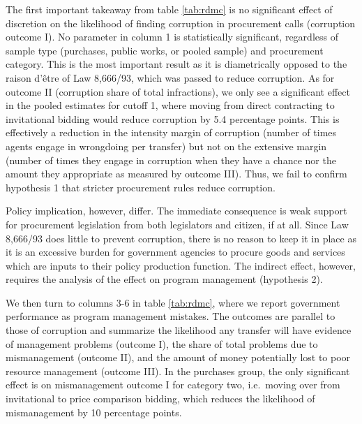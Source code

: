 \documentclass[11pt]{article}
\begin{document}
The first important takeaway from table \ref{tab:rdmc} is no significant effect of discretion on the likelihood of finding corruption in procurement calls (corruption outcome I). No parameter in column 1 is statistically significant, regardless of sample type (purchases, public works, or pooled sample) and procurement category. This is the most important result as it is diametrically opposed to the raison d'être of Law 8,666/93, which was passed to reduce corruption. As for outcome II (corruption share of total infractions), we only see a significant effect in the pooled estimates for cutoff 1, where moving from direct contracting to invitational bidding would reduce corruption by 5.4 percentage points. This is effectively a reduction in the intensity margin of corruption (number of times agents engage in wrongdoing per transfer) but not on the extensive margin (number of times they engage in corruption when they have a chance nor the amount they appropriate as measured by outcome III). Thus, we fail to confirm hypothesis 1 that stricter procurement rules reduce corruption.

Policy implication, however, differ. The immediate consequence is weak support for procurement legislation from both legislators and citizen, if at all. Since Law 8,666/93 does little to prevent corruption, there is no reason to keep it in place as it is an excessive burden for government agencies to procure goods and services which are inputs to their policy production function. The indirect effect, however, requires the analysis of the effect on program management (hypothesis 2).
\clearpage


We then turn to columns 3-6 in table \ref{tab:rdmc}, where we report government performance as program management mistakes. The outcomes are parallel to those of corruption and summarize the likelihood any transfer will have evidence of management problems (outcome I), the share of total problems due to mismanagement (outcome II), and the amount of money potentially lost to poor resource management (outcome III). In the purchases group, the only significant effect is on mismanagement outcome I for category two, i.e.~moving over from invitational to price comparison bidding, which reduces the likelihood of mismanagement by 10 percentage points.
\end{document}
